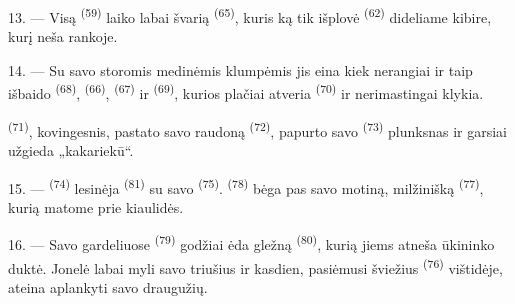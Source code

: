 13. --- Visą  \textsuperscript{(59)} laiko labai švarią  \textsuperscript{(65)}, kuris ką tik išplovė 
\textsuperscript{(62)} dideliame kibire, kurį neša rankoje.

\VUsaut{3.0mm}
\VUsaut{3.0mm}

14. --- Su savo storomis medinėmis klumpėmis jis eina kiek nerangiai ir taip
išbaido  \textsuperscript{(68)}, 
\textsuperscript{(66)},  \textsuperscript{(67)} ir 
\textsuperscript{(69)}, kurios plačiai atveria 
\textsuperscript{(70)} ir nerimastingai klykia.

 \textsuperscript{(71)}, kovingesnis, pastato savo raudoną
 \textsuperscript{(72)}, papurto savo 
\textsuperscript{(73)} plunksnas ir garsiai užgieda „kakariekū“.

15. ---  \textsuperscript{(74)} lesinėja
 \textsuperscript{(81)} su savo 
\textsuperscript{(75)}.  \textsuperscript{(78)} bėga pas savo motiną,
milžinišką  \textsuperscript{(77)}, kurią matome prie kiaulidės.

16. --- Savo gardeliuose  \textsuperscript{(79)} godžiai ėda
gležną  \textsuperscript{(80)}, kurią jiems atneša ūkininko duktė.
Jonelė labai myli savo triušius ir kasdien, pasiėmusi šviežius 
\textsuperscript{(76)} vištidėje, ateina aplankyti savo draugužių.

\VUsaut{6.0mm}
\VUfilet{22mm}
